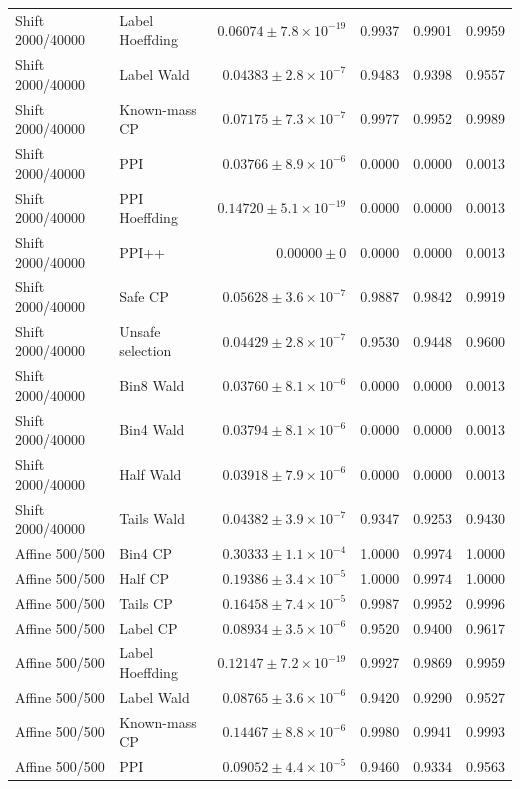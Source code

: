 \begin{longtable}{llrrrr}
Shift 2000/40000 & Label Hoeffding & $0.06074\pm 7.8\times 10^{-19}$ & 0.9937 & 0.9901 & 0.9959 \\
Shift 2000/40000 & Label Wald & $0.04383\pm 2.8\times 10^{-7}$ & 0.9483 & 0.9398 & 0.9557 \\
Shift 2000/40000 & Known-mass CP & $0.07175\pm 7.3\times 10^{-7}$ & 0.9977 & 0.9952 & 0.9989 \\
Shift 2000/40000 & PPI & $0.03766\pm 8.9\times 10^{-6}$ & 0.0000 & 0.0000 & 0.0013 \\
Shift 2000/40000 & PPI Hoeffding & $0.14720\pm 5.1\times 10^{-19}$ & 0.0000 & 0.0000 & 0.0013 \\
Shift 2000/40000 & PPI++ & $0.00000\pm 0$ & 0.0000 & 0.0000 & 0.0013 \\
Shift 2000/40000 & Safe CP & $0.05628\pm 3.6\times 10^{-7}$ & 0.9887 & 0.9842 & 0.9919 \\
Shift 2000/40000 & Unsafe selection & $0.04429\pm 2.8\times 10^{-7}$ & 0.9530 & 0.9448 & 0.9600 \\
Shift 2000/40000 & Bin8 Wald & $0.03760\pm 8.1\times 10^{-6}$ & 0.0000 & 0.0000 & 0.0013 \\
Shift 2000/40000 & Bin4 Wald & $0.03794\pm 8.1\times 10^{-6}$ & 0.0000 & 0.0000 & 0.0013 \\
Shift 2000/40000 & Half Wald & $0.03918\pm 7.9\times 10^{-6}$ & 0.0000 & 0.0000 & 0.0013 \\
Shift 2000/40000 & Tails Wald & $0.04382\pm 3.9\times 10^{-7}$ & 0.9347 & 0.9253 & 0.9430 \\
Affine 500/500 & Bin4 CP & $0.30333\pm 1.1\times 10^{-4}$ & 1.0000 & 0.9974 & 1.0000 \\
Affine 500/500 & Half CP & $0.19386\pm 3.4\times 10^{-5}$ & 1.0000 & 0.9974 & 1.0000 \\
Affine 500/500 & Tails CP & $0.16458\pm 7.4\times 10^{-5}$ & 0.9987 & 0.9952 & 0.9996 \\
Affine 500/500 & Label CP & $0.08934\pm 3.5\times 10^{-6}$ & 0.9520 & 0.9400 & 0.9617 \\
Affine 500/500 & Label Hoeffding & $0.12147\pm 7.2\times 10^{-19}$ & 0.9927 & 0.9869 & 0.9959 \\
Affine 500/500 & Label Wald & $0.08765\pm 3.6\times 10^{-6}$ & 0.9420 & 0.9290 & 0.9527 \\
Affine 500/500 & Known-mass CP & $0.14467\pm 8.8\times 10^{-6}$ & 0.9980 & 0.9941 & 0.9993 \\
Affine 500/500 & PPI & $0.09052\pm 4.4\times 10^{-5}$ & 0.9460 & 0.9334 & 0.9563 \\

\end{longtable}
